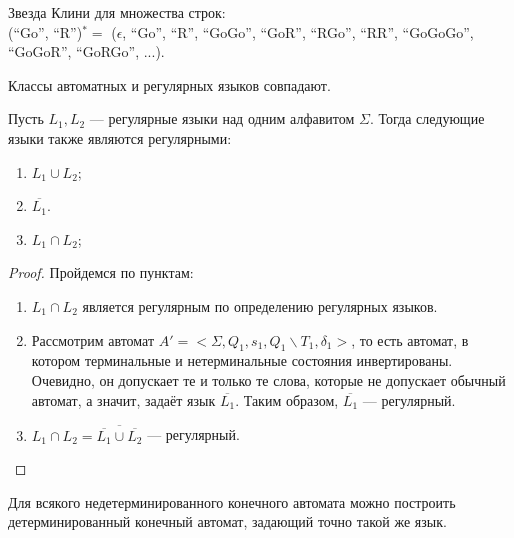     \begin{Example}
        Звезда Клини для множества строк:\\ (``Go'', ``R'')$^* = $
        ($\epsilon$, ``Go'', ``R'', ``GoGo'', ``GoR'', ``RGo'', ``RR'', ``GoGoGo'', ``GoGoR'', ``GoRGo'', ...).
    \end{Example}
    
    \begin{Thm}
        Классы автоматных и регулярных языков совпадают.
    \end{Thm}
    
    \begin{Thm}
        Пусть $L_1, L_2$ --- регулярные языки над одним алфавитом $\Sigma$. Тогда следующие языки также являются регулярными:
        \begin{enumerate}
            \item $L_1 \cup L_2$;
            \item $\overline{L_1}$.
            \item $L_1 \cap L_2$;
        \end{enumerate}
    \end{Thm}
    
    \begin{proof}
        Пройдемся по пунктам:
        \begin{enumerate}
            \item $L_1 \cap L_2$ является регулярным по определению регулярных языков.
            \item Рассмотрим автомат $A' = <\Sigma, Q_1, s_1,Q_1 \backslash T_1,\delta_1>$, то есть автомат, в котором терминальные и нетерминальные состояния инвертированы. Очевидно, он допускает те и только те слова, которые не допускает обычный автомат, а значит, задаёт язык $\overline{L_1}$. Таким образом, $\overline{L_1}$ --- регулярный.
            \item $L_1 \cap L_2 = \overline{\overline{L_1} \cup \overline{L_2}}$ --- регулярный.
        \end{enumerate}
    \end{proof}


    \begin{Thm}
        Для всякого недетерминированного конечного автомата можно построить детерминированный конечный автомат, задающий точно такой же язык. 
    \end{Thm}
    
